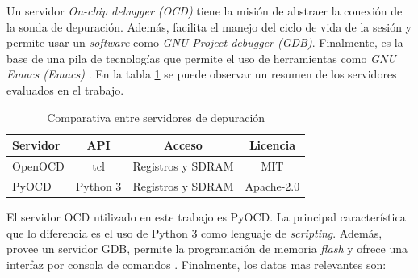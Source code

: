 Un servidor \emph{On-chip debugger (OCD)} tiene la misión de abstraer la conexión de la sonda de depuración.
Además, facilita el manejo del ciclo de vida de la sesión y permite usar un \emph{software} como \emph{GNU Project debugger (GDB)}.
Finalmente, es la base de una pila de tecnologías que permite el uso de herramientas como \emph{GNU Emacs (Emacs)} \citep{BOOK:gdb}.
En la tabla \ref{tab:servidores} se puede observar un resumen de los servidores evaluados en el trabajo.

\begin{table}[h]
	\centering
	\caption[Servidores de depuración]{Comparativa entre servidores de depuración}
	\begin{tabular}{l c c c}    
		\toprule
        \textbf{Servidor} & \textbf{API} & \textbf{Acceso}   & \textbf{Licencia}\\
		\midrule
        OpenOCD           & tcl                         & Registros y SDRAM & MIT\\        	
        PyOCD             & Python 3                    & Registros y SDRAM & Apache-2.0\\
		\bottomrule
		\hline
	\end{tabular}
	\label{tab:servidores}
\end{table}

El servidor OCD utilizado en este trabajo es PyOCD.
La principal característica que lo diferencia es el uso de Python 3 como lenguaje de \emph{scripting}.
Además, provee un servidor GDB, permite la programación de memoria \emph{flash} y ofrece una interfaz por consola de comandos \citep{WEBSITE:pyocd}.
Finalmente, los datos mas relevantes son:

